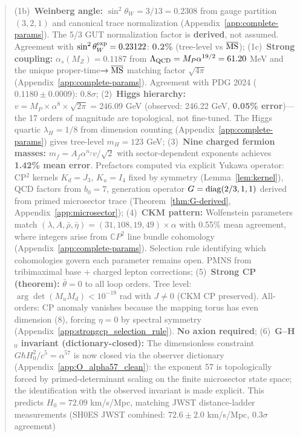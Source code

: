 \documentclass[aps,prd,twocolumn,superscriptaddress,showpacs,floatfix,nofootinbib]{revtex4-2}
\theoremstyle{plain}
\theoremstyle{definition}
\theoremstyle{remark}
\begin{document}
\begin{abstract}
%
(1b)~\textbf{Weinberg angle:} $\sin^2\theta_W = 3/13 = 0.2308$ from gauge partition $(3,2,1)$ and canonical trace normalization 
(Appendix~\ref{app:complete-params}). The 5/3 GUT normalization factor is \textbf{derived}, not assumed. 
Agreement with $\sin^2\theta_W^{\rm exp} = 0.23122$: \textbf{0.2\%} (tree-level vs $\overline{\rm MS}$);
%
(1c)~\textbf{Strong coupling:} $\alpha_s(M_Z) = 0.1187$ from $\Lambda_{\rm QCD} = M_P \alpha^{19/2} = 61.20$ MeV 
and the unique proper-time$\to\overline{\rm MS}$ matching factor $\sqrt{4\pi}$ (Appendix~\ref{app:complete-params}). 
Agreement with PDG 2024 ($0.1180 \pm 0.0009$): \textbf{$0.8\sigma$};
%
(2)~\textbf{Higgs hierarchy:} $v = M_P \times \alpha^8 \times \sqrt{2\pi} = 246.09$ GeV 
(observed: 246.22 GeV, \textbf{0.05\% error})---the 17 orders of magnitude are topological, not fine-tuned. 
The Higgs quartic $\lambda_H = 1/8$ from dimension counting (Appendix~\ref{app:complete-params}) gives tree-level $m_H = 123$ GeV;
%
(3)~\textbf{Nine charged fermion masses:} $m_f = A_f \alpha^{n_f} v/\sqrt{2}$ with sector-dependent exponents 
achieves \textbf{1.42\% mean error}. Prefactors computed via explicit Yukawa operator: CP$^2$ kernels 
$K_d = J_3$, $K_u = I_4$ fixed by symmetry (Lemma~\ref{lem:kernel}), QCD factors from $b_0 = 7$, 
generation operator $G = {\rm diag}(2/3,1,1)$ derived from primed microsector trace (Theorem~\ref{thm:G-derived}, Appendix~\ref{app:microsector});
%
(4)~\textbf{CKM pattern:} Wolfenstein parameters match 
$(\lambda, A, \bar{\rho}, \bar{\eta}) = (31, 108, 19, 49) \times \alpha$ with 0.55\% mean agreement, where integers 
arise from $\mathbb{C}P^2$ line bundle cohomology (Appendix~\ref{app:complete-params}). Selection rule identifying 
which cohomologies govern each parameter remains open. PMNS from tribimaximal base + charged lepton corrections;
%
(5)~\textbf{Strong CP (theorem):} $\bar\theta = 0$ to all loop orders. Tree level: $\arg\det(M_u M_d) < 10^{-19}$ rad 
with $J \neq 0$ (CKM CP preserved). All-orders: CP anomaly vanishes because the mapping torus has even dimension (8), 
forcing $\eta = 0$ by spectral symmetry (Appendix~\ref{app:strongcp_selection_rule}). \textbf{No axion required};
%
(6)~\textbf{G--H$_0$ invariant (dictionary-closed):} The dimensionless constraint $G\hbar H_0^2/c^5 = \alpha^{57}$ is now closed 
via the observer dictionary (Appendix~\ref{app:O_alpha57_clean}): the exponent 57 is topologically forced by primed-determinant 
scaling on the finite microsector state space; the identification with the observed invariant is made explicit. 
This predicts $H_0 = 72.09$ km/s/Mpc, matching JWST distance-ladder measurements (SH0ES JWST combined: $72.6 \pm 2.0$ km/s/Mpc, $0.3\sigma$ agreement) 

\end{abstract}
\end{document}
